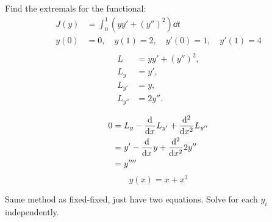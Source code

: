 {\tiny
Find the extremals for the functional:
\begin{equation}
  \label{eq:4.4.1d-problem}
  \begin{aligned}
    J(y) &= \int_0^1 (yy'+{(y'')}^2)\dd{t} \\
    y(0) &= 0, \quad y(1) = 2, \quad y'(0) = 1,\quad y'(1) = 4 \\
  \end{aligned}
\end{equation}
\begin{align*}
  L &= yy'+{(y'')}^2, \\
  L_y &= y', \\
  L_{y'} &= y, \\
  L_{y''} &= 2y''. \\
\end{align*}
\begin{align*}
  0 &= L_y - \od{}{x}L_{y'} + \od[2]{}{x}L_{y''} \\
    &= y' - \od{}{x}y + \od[2]{}{x}2y'' \\
    &= y'''' \\
\end{align*}
\begin{equation*}
  \boxed{y(x) = x + x^3}
\end{equation*}
}

\item[Multivariable Fixed-Fixed] Same method as fixed-fixed, just have two
  equations. Solve for each $y_i$ independently.
